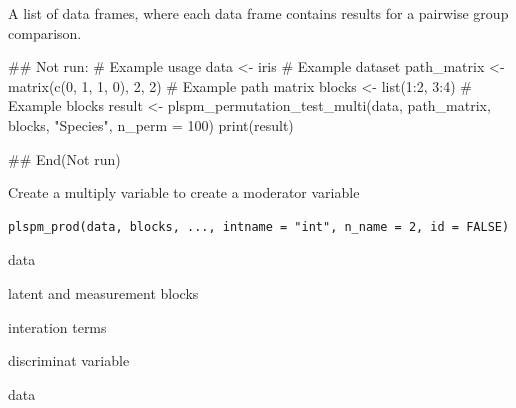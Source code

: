 \documentclass[a4paper]{book}
\begin{document}
%
\begin{Value}
A list of data frames, where each data frame contains results for a pairwise group comparison.
\end{Value}
%
\begin{Examples}
\begin{ExampleCode}
\#\# Not run: 
# Example usage
data <- iris  # Example dataset
path_matrix <- matrix(c(0, 1, 1, 0), 2, 2)  # Example path matrix
blocks <- list(1:2, 3:4)  # Example blocks
result <- plspm_permutation_test_multi(data, path_matrix, blocks, "Species", n_perm = 100)
print(result)

## End(Not run)
\end{ExampleCode}
\end{Examples}
%
\begin{Description}
Create a multiply variable to create a moderator variable
\end{Description}
%
\begin{Usage}
\begin{verbatim}
plspm_prod(data, blocks, ..., intname = "int", n_name = 2, id = FALSE)
\end{verbatim}
\end{Usage}
%
\begin{Arguments}
\begin{ldescription}
\item[\code{data}] data

\item[\code{blocks}] latent and measurement blocks

\item[\code{...}] interation terms

\item[\code{id}] discriminat variable
\end{ldescription}
\end{Arguments}
%
\begin{Value}
data
\end{Value}
%
\end{document}
